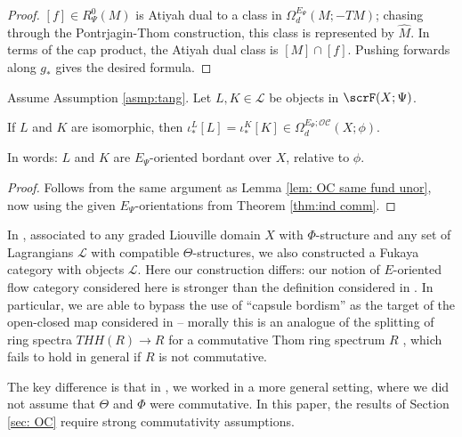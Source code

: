 \documentclass{TPmod}
\newcommand{\cC}{\mathcal{C}}
\newcommand{\cL}{\mathcal{L}}
\newcommand{\cO}{\mathcal{O}}
\numberwithin{equation}{section}
\begin{document}
    
    \begin{proof}
        $[f] \in R_\Psi^0(M)$ is Atiyah dual to a class in $\Omega^{E_\Psi}_d(M; -TM)$; chasing through the Pontrjagin-Thom construction, this class is represented by $\hat M$. In terms of the cap product, the Atiyah dual class is $[M] \cap [f]$. Pushing forwards along $g_*$ gives the desired formula.
    \end{proof}

    
    \begin{prop}\label{prop: quas same fund no loc}
        Assume Assumption \ref{asmp:tang}. Let $L, K \in \cL$ be objects in $\scrF(X; \Psi)$.

        If $L$ and $K$ are isomorphic, then $\iota^L_*[L] = \iota^K_*[K] \in \Omega^{E_\Psi; \cO\cC}_d(X; \phi)$.

        In words: $L$ and $K$ are $E_\Psi$-oriented bordant over $X$, relative to $\phi$.
    \end{prop}
    \begin{proof}
        Follows from the same argument as Lemma \ref{lem: OC same fund unor}, now using the given $E_\Psi$-orientations from Theorem \ref{thm:ind comm}.
    \end{proof}
    \begin{rmk}
    
        In \cite{PS2}, associated to any graded Liouville domain $X$ with $\Phi$-structure and any set of Lagrangians $\cL$ with compatible $\Theta$-structures, we also constructed a Fukaya category with objects $\cL$. Here our construction differs: our notion of $E$-oriented flow category considered here is stronger than the definition considered in \cite[Section 5]{PS2}. 
        In particular, we are able to bypass the use of ``capsule bordism'' as the target of the open-closed map considered in \cite[Section 5.10]{PS}-- morally this is an analogue of the splitting of ring spectra $THH(R) \to R$ for a commutative Thom ring spectrum $R$ \cite{Blumberg-THH}, which fails to hold in general if $R$ is not commutative.
        
        The key difference is that in \cite{PS2}, we worked in a more general setting, where we did not assume that $\Theta$ and $\Phi$ were commutative. In this paper, the results of Section \ref{sec: OC} require strong commutativity assumptions.
    \end{rmk}
\end{document}
